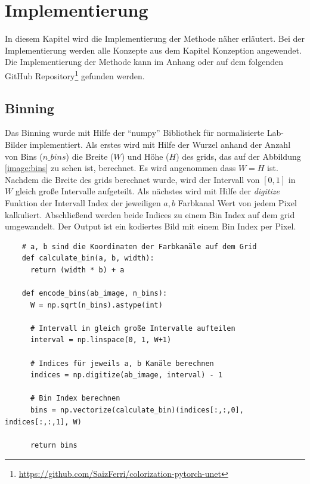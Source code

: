 \chapter{Implementierung}
In diesem Kapitel wird die Implementierung der Methode näher erläutert. Bei der Implementierung werden alle Konzepte aus dem
Kapitel Konzeption angewendet. Die Implementierung der Methode kann im Anhang oder auf dem folgenden GitHub Repository\footnote{\url{https://github.com/SaizFerri/colorization-pytorch-unet}} gefunden werden.

\section{Binning}
Das Binning wurde mit Hilfe der ``numpy'' Bibliothek für normalisierte Lab-Bilder implementiert.
Als erstes wird mit Hilfe der Wurzel
anhand der Anzahl von Bins ($n\_bins$) die Breite ($W$) und Höhe ($H$) des \gls{grid}s, das auf der Abbildung \ref{image:bins} zu sehen ist,
berechnet. Es wird angenommen dass $W = H$ ist.
Nachdem die Breite des \gls{grid}s berechnet wurde, wird der Intervall von $[0, 1]$ in $W$ gleich große Intervalle aufgeteilt. Als nächstes
wird mit Hilfe der \textit{digitize} Funktion der Intervall Index der jeweiligen $a, b$ Farbkanal Wert von jedem Pixel kalkuliert.
Abschließend werden beide Indices zu einem Bin Index auf dem \gls{grid} umgewandelt. Der Output ist ein kodiertes Bild mit einem Bin Index per Pixel.
\\

\begin{listing}[H]
  \begin{verbatim}
    # a, b sind die Koordinaten der Farbkanäle auf dem Grid
    def calculate_bin(a, b, width):
      return (width * b) + a
  
    def encode_bins(ab_image, n_bins):
      W = np.sqrt(n_bins).astype(int)
  
      # Intervall in gleich große Intervalle aufteilen
      interval = np.linspace(0, 1, W+1)
  
      # Indices für jeweils a, b Kanäle berechnen
      indices = np.digitize(ab_image, interval) - 1
  
      # Bin Index berechnen
      bins = np.vectorize(calculate_bin)(indices[:,:,0], indices[:,:,1], W)
  
      return bins
  \end{verbatim}
\end{listing}

